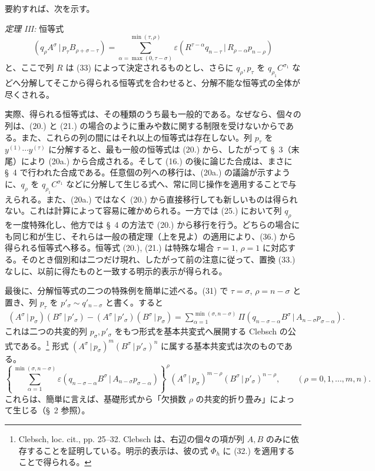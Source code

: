 \documentclass[11pt]{article}
\newcommand{\pair}[2]{(#1\,|\,#2)}
\newcommand{\eps}{\varepsilon}
\begin{document}
要約すれば、次を示す。

\emph{定理 III:} 恒等式
\begin{equation}
 \pair{q_\rho A^\sigma}{p_\tau B_{\rho+\sigma-\tau}}
 =\sum_{\alpha=\max(0,\tau-\sigma)}^{\min(\tau,\rho)}
 \eps\pair{R^{\tau-\alpha}q_{n-\tau}}{R_{\rho-\alpha}p_{n-\rho}}
\tag{36}
\end{equation}
と、ここで列 $R$ は (33) によって決定されるものとし、さらに $q_\rho,p_\tau$ を $q_{\rho_1}C^{\sigma_1}$ などへ分解してそこから得られる恒等式を合わせると、分解不能な恒等式の全体が尽くされる。

実際、得られる恒等式は、その種類のうち最も一般的である。なぜなら、個々の列は、(20.) と (21.) の場合のように重みや数に関する制限を受けないからである。また、これらの列の間にはそれ以上の恒等式は存在しない。列 $p_\tau$ を $y^{(1)}\cdots y^{(\tau)}$ に分解すると、最も一般の恒等式は (20.) から、したがって \S\ 3（末尾）により (20a.) から合成される。そして (16.) の後に論じた合成は、まさに \S\ 4 で行われた合成である。任意個の列への移行は、(20a.) の議論が示すように、$q_\rho$ を $q_{\rho_1}C^{\sigma_1}$ などに分解して生じる式へ、常に同じ操作を適用することで与えられる。また、(20a.) ではなく (20.) から直接移行しても新しいものは得られない。これは計算によって容易に確かめられる。一方では (25.) において列 $q_\rho$ を一度特殊化し、他方では \S\ 4 の方法で (20.) から移行を行う。どちらの場合にも同じ和が生じ、それらは一般の積定理（上を見よ）の適用により、(36.) から得られる恒等式へ移る。恒等式 (20.), (21.) は特殊な場合 $\tau=1$, $\rho=1$ に対応する。そのとき個別和は二つだけ現れ、したがって前の注意に従って、置換 (33.) なしに、以前に得たものと一致する明示的表示が得られる。

最後に、分解恒等式の二つの特殊例を簡単に述べる。(31) で $\tau=\sigma$, $\rho=n-\sigma$ と置き、列 $p_\tau$ を $p'_\sigma\sim q'_{n-\sigma}$ と書く。すると
\begin{equation}
\begin{aligned}
\pair{A^\sigma}{p_\sigma}\pair{B^\sigma}{p'_\sigma}
-\pair{A^\sigma}{p'_\sigma}\pair{B^\sigma}{p_\sigma}
=\sum_{\alpha=1}^{\min(\sigma,n-\sigma)}
\Pi\pair{q_{n-\sigma-\alpha}B^\sigma}{A_{n-\sigma}p_{\sigma-\alpha}}.
\end{aligned}
\tag{37}
\end{equation}
これは二つの共変的列 $p_\sigma,p'_\sigma$ をもつ形式を基本共変式へ展開する Clebsch の公式である。\footnote{Clebsch, loc. cit., pp. 25--32. Clebsch は、右辺の個々の項が列 $A,B$ のみに依存することを証明している。明示的表示は、彼の式 $\Phi_h$ に (32.) を適用することで得られる。} 形式 $\pair{A^\sigma}{p_\sigma}^m\pair{B^\sigma}{p'_\sigma}^n$ に属する基本共変式は次のものである。
\begin{equation}
 \left\{\sum_{\alpha=1}^{\min(\sigma,n-\sigma)}
 \eps\pair{q_{n-\sigma-\alpha}B^\sigma}{A_{n-\sigma}p_{\sigma-\alpha}}
 \right\}^{\rho}
 \pair{A^\sigma}{p_\sigma}^{m-\rho}\pair{B^\sigma}{p'_\sigma}^{n-\rho},
 \qquad (\rho=0,1,\ldots,m,n).
\tag{38}
\end{equation}
これらは、簡単に言えば、基礎形式から「欠損数 $\rho$ の共変的折り畳み」によって生じる（\S\ 2 参照）。
\end{document}
